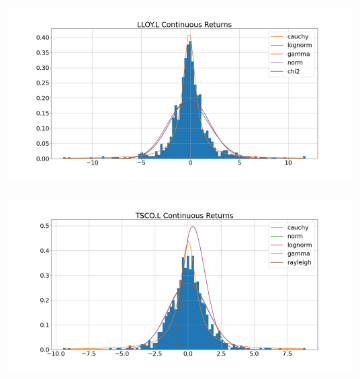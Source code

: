 \begin{figure}[hbt!]

\begin{subfigure}{.49\linewidth}
  \includegraphics[width=\linewidth]{images/returnDist/plot 1.png}
  \caption{}
  \label{MLEDdet}
\end{subfigure} %
\begin{subfigure}{.49\linewidth}
  \includegraphics[width=\linewidth]{images/returnDist/plot 2.png}
  \caption{}
  \label{energydetPSK}
\end{subfigure}


\end{figure}
